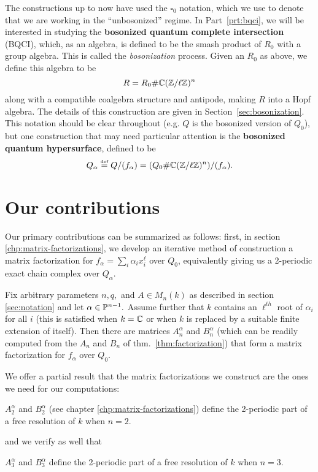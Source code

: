 \documentclass [11pt, proquest] {uwthesis}[2020/02/24]
\begin{document}
    The constructions up to now have used the $\square_0$ notation, which we use to denote that we are working in the ``unbosonized'' regime. In Part~\ref{prt:bqci}, we will be interested in studying the \textbf{bosonized quantum complete intersection} (BQCI), which, as an algebra, is defined to be the smash product of $R_0$ with a group algebra. This is called the \textit{bosonization} process. Given an $R_0$ as above, we define this algebra to be
    \[R = R_0 \# \mathbb{C}(\mathbb{Z}/\ell\mathbb{Z})^n\]
    along with a compatible coalgebra structure and antipode, making $R$ into a Hopf algebra. The details of this construction are given in Section~\ref{sec:bosonization}. This notation should be clear throughout (e.g. $Q$ is the bosonized version of $Q_0$), but one construction that may need particular attention is the \textbf{bosonized quantum hypersurface}, defined to be
    \[Q_\alpha\stackrel{\text{\tiny def}}{=} Q/(f_\alpha)=(Q_0\#\mathbb{C}(\mathbb{Z}/\ell\mathbb{Z})^n)/(f_\alpha).\]
    
\section{Our contributions}
    Our primary contributions can be summarized as follows: first, in section \ref{chp:matrix-factorizations}, we develop an iterative method of construction a matrix factorization for $f_\alpha=\sum_i\alpha_ix_i^\ell$ over $Q_0$, equivalently giving us a 2-periodic exact chain complex over $Q_\alpha.$ 
    \begingroup
    \def\thethm{2.16}
    \addtocounter{thm}{-1}
    \begin{thm}
        Fix arbitrary parameters $n,q,$ and $A\in M_n(k)$ as described in section \ref{sec:notation} and let $\alpha\in\mathbb{P}^{n-1}.$ Assume further that $k$ contains an $\ell^{th}$ root of $\alpha_i$ for all $i$ (this is satisfied when $k=\mathbb{C}$ or when $k$ is replaced by a suitable finite extension of itself). Then there are matrices $A_n^\alpha$ and $B_n^\alpha$ (which can be readily computed from the $A_n$ and $B_n$ of thm.~\ref{thm:factorization}) that form a matrix factorization for $f_\alpha$ over $Q_0$.    
    \end{thm}
    \endgroup
    
    We offer a partial result that the matrix factorizations we construct are the ones we need for our computations:
    \begingroup
    \def\thethm{2.19}
    \addtocounter{thm}{-1}
    \begin{lem}
        $A_2^\alpha$ and $B_2^\alpha$ (see chapter \ref{chp:matrix-factorizations}) define the 2-periodic part of a free resolution of $k$ when $n=2.$ 
    \end{lem}
    \endgroup
    and we verify as well that
    \begingroup
    \def\thethm{2.20}
    \addtocounter{thm}{-1}
    \begin{lem}
        $A_3^\alpha$ and $B_3^\alpha$ define the 2-periodic part of a free resolution of $k$ when $n=3.$
    \end{lem}
    \endgroup
    
\end{document}
